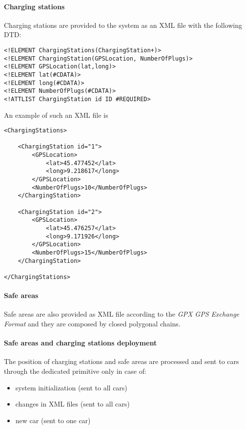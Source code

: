 \paragraph{Charging stations}Charging stations are provided to the system as an XML file with the following DTD:
\lstset{language=XML,frame=false}
\begin{lstlisting}
<!ELEMENT ChargingStations(ChargingStation+)>
<!ELEMENT ChargingStation(GPSLocation, NumberOfPlugs)>
<!ELEMENT GPSLocation(lat,long)>
<!ELEMENT lat(#CDATA)>
<!ELEMENT long(#CDATA)>
<!ELEMENT NumberOfPlugs(#CDATA)>
<!ATTLIST ChargingStation id ID #REQUIRED>
\end{lstlisting}
An example of such an XML file is 
\begin{lstlisting}
<ChargingStations>

	<ChargingStation id="1">
		<GPSLocation>
			<lat>45.477452</lat>
			<long>9.218617</long>
		</GPSLocation>
		<NumberOfPlugs>10</NumberOfPlugs>
	</ChargingStation>
	
	<ChargingStation id="2">
		<GPSLocation>
			<lat>45.476257</lat>
			<long>9.171926</long>
		</GPSLocation>
		<NumberOfPlugs>15</NumberOfPlugs>
	</ChargingStation>
	
</ChargingStations>
\end{lstlisting}

\clearpage

\paragraph{Safe areas}Safe areas are also provided as XML file according to the \emph{GPX GPS Exchange Format} \cite{gpx} and they are composed by closed polygonal chains.

\paragraph{Safe areas and charging stations deployment}The position of charging stations and safe areas are processed and sent to cars through the dedicated primitive only in case of:
\begin{itemize}
	\item system initialization (sent to all cars)
	\item changes in XML files (sent to all cars)
	\item new car (sent to one car)
\end{itemize}

